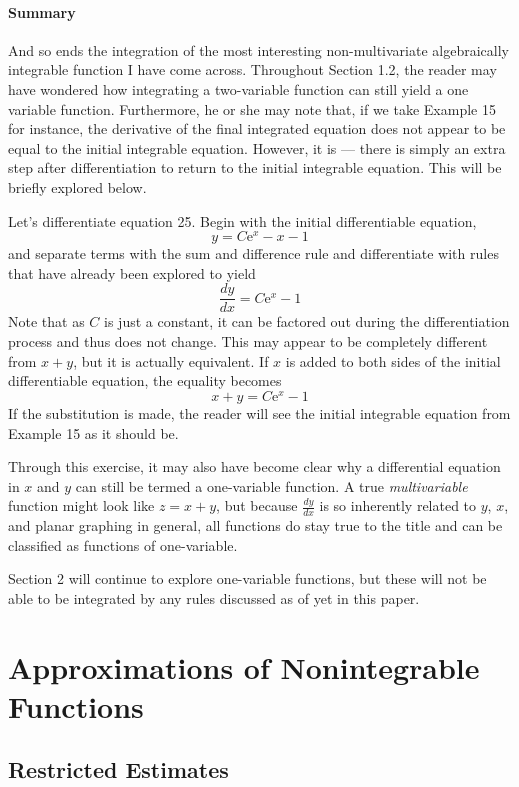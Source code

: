 \documentclass{article}
\begin{document}
\paragraph{Summary} And so ends the integration of the most interesting non-multivariate algebraically integrable function I have come across. Throughout Section 1.2, the reader may have wondered how integrating a two-variable function can still yield a one variable function. Furthermore, he or she may note that, if we take Example 15 for instance, the derivative of the final integrated equation does not appear to be equal to the initial integrable equation. However, it is --- there is simply an extra step after differentiation to return to the initial integrable equation. This will be briefly explored below.\par
Let's differentiate equation 25. Begin with the initial differentiable equation,$$y=C\text{e}^{x}-x-1$$and separate terms with the sum and difference rule and differentiate with rules that have already been explored to yield$$\frac{dy}{dx}=C\text{e}^x-1$$Note that as $C$ is just a constant, it can be factored out during the differentiation process and thus does not change. This may appear to be completely different from $x+y$, but it is actually equivalent. If $x$ is added to both sides of the initial differentiable equation, the equality becomes$$x+y=C\text{e}^x-1$$If the substitution is made, the reader will see the initial integrable equation from Example 15 as it should be.\par
Through this exercise, it may also have become clear why a differential equation in $x$ and $y$ can still be termed a one-variable function. A true \emph{multivariable} function might look like $z=x+y$, but because $\frac{dy}{dx}$ is so inherently related to $y$, $x$, and planar graphing in general, all functions do stay true to the title and can be classified as functions of one-variable.\par
Section 2 will continue to explore one-variable functions, but these will not be able to be integrated by any rules discussed as of yet in this paper.
\newpage



\section{Approximations of Nonintegrable Functions}
\subsection{Restricted Estimates}
\end{document}
